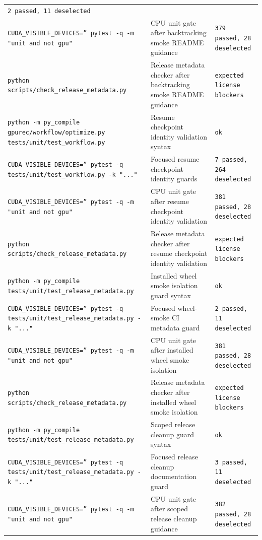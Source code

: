 \documentclass[11pt]{article}
\begin{document}
\begin{center}
\begin{tabular}{lll}
\texttt{2 passed, 11 deselected} \\
\texttt{CUDA\_VISIBLE\_DEVICES='' pytest -q -m "unit and not gpu"} &
CPU unit gate after backtracking smoke README guidance &
\texttt{379 passed, 28 deselected} \\
\texttt{python scripts/check\_release\_metadata.py} &
Release metadata checker after backtracking smoke README guidance &
\texttt{expected license blockers} \\
\texttt{python -m py\_compile gpurec/workflow/optimize.py tests/unit/test\_workflow.py} &
Resume checkpoint identity validation syntax &
\texttt{ok} \\
\texttt{CUDA\_VISIBLE\_DEVICES='' pytest -q tests/unit/test\_workflow.py -k "..."} &
Focused resume checkpoint identity guards &
\texttt{7 passed, 264 deselected} \\
\texttt{CUDA\_VISIBLE\_DEVICES='' pytest -q -m "unit and not gpu"} &
CPU unit gate after resume checkpoint identity validation &
\texttt{381 passed, 28 deselected} \\
\texttt{python scripts/check\_release\_metadata.py} &
Release metadata checker after resume checkpoint identity validation &
\texttt{expected license blockers} \\
\texttt{python -m py\_compile tests/unit/test\_release\_metadata.py} &
Installed wheel smoke isolation guard syntax &
\texttt{ok} \\
\texttt{CUDA\_VISIBLE\_DEVICES='' pytest -q tests/unit/test\_release\_metadata.py -k "..."} &
Focused wheel-smoke CI metadata guard &
\texttt{2 passed, 11 deselected} \\
\texttt{CUDA\_VISIBLE\_DEVICES='' pytest -q -m "unit and not gpu"} &
CPU unit gate after installed wheel smoke isolation &
\texttt{381 passed, 28 deselected} \\
\texttt{python scripts/check\_release\_metadata.py} &
Release metadata checker after installed wheel smoke isolation &
\texttt{expected license blockers} \\
\texttt{python -m py\_compile tests/unit/test\_release\_metadata.py} &
Scoped release cleanup guard syntax &
\texttt{ok} \\
\texttt{CUDA\_VISIBLE\_DEVICES='' pytest -q tests/unit/test\_release\_metadata.py -k "..."} &
Focused release cleanup documentation guard &
\texttt{3 passed, 11 deselected} \\
\texttt{CUDA\_VISIBLE\_DEVICES='' pytest -q -m "unit and not gpu"} &
CPU unit gate after scoped release cleanup guidance &
\texttt{382 passed, 28 deselected} \\

\end{tabular}
\end{center}
\end{document}
